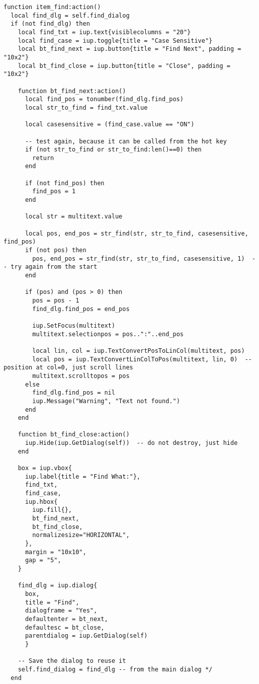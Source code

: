 \documentclass{ctexart}
\begin{document}
\begin{lstlisting}
function item_find:action()
  local find_dlg = self.find_dialog
  if (not find_dlg) then
    local find_txt = iup.text{visiblecolumns = "20"}
    local find_case = iup.toggle{title = "Case Sensitive"}
    local bt_find_next = iup.button{title = "Find Next", padding = "10x2"}
    local bt_find_close = iup.button{title = "Close", padding = "10x2"}

    function bt_find_next:action()
      local find_pos = tonumber(find_dlg.find_pos)
      local str_to_find = find_txt.value

      local casesensitive = (find_case.value == "ON")

      -- test again, because it can be called from the hot key
      if (not str_to_find or str_to_find:len()==0) then
        return
      end

      if (not find_pos) then
        find_pos = 1
      end

      local str = multitext.value

      local pos, end_pos = str_find(str, str_to_find, casesensitive, find_pos)
      if (not pos) then
        pos, end_pos = str_find(str, str_to_find, casesensitive, 1)  -- try again from the start
      end

      if (pos) and (pos > 0) then
        pos = pos - 1
        find_dlg.find_pos = end_pos

        iup.SetFocus(multitext)
        multitext.selectionpos = pos..":"..end_pos

        local lin, col = iup.TextConvertPosToLinCol(multitext, pos)
        local pos = iup.TextConvertLinColToPos(multitext, lin, 0)  -- position at col=0, just scroll lines
        multitext.scrolltopos = pos
      else
        find_dlg.find_pos = nil
        iup.Message("Warning", "Text not found.")
      end
    end

    function bt_find_close:action()
      iup.Hide(iup.GetDialog(self))  -- do not destroy, just hide
    end

    box = iup.vbox{
      iup.label{title = "Find What:"},
      find_txt,
      find_case,
      iup.hbox{
        iup.fill{},
        bt_find_next,
        bt_find_close,
        normalizesize="HORIZONTAL", 
      },
      margin = "10x10", 
      gap = "5",
    }

    find_dlg = iup.dialog{
      box, 
      title = "Find", 
      dialogframe = "Yes", 
      defaultenter = bt_next, 
      defaultesc = bt_close,
      parentdialog = iup.GetDialog(self)
      }

    -- Save the dialog to reuse it 
    self.find_dialog = find_dlg -- from the main dialog */
  end


\end{lstlisting}
\end{document}
